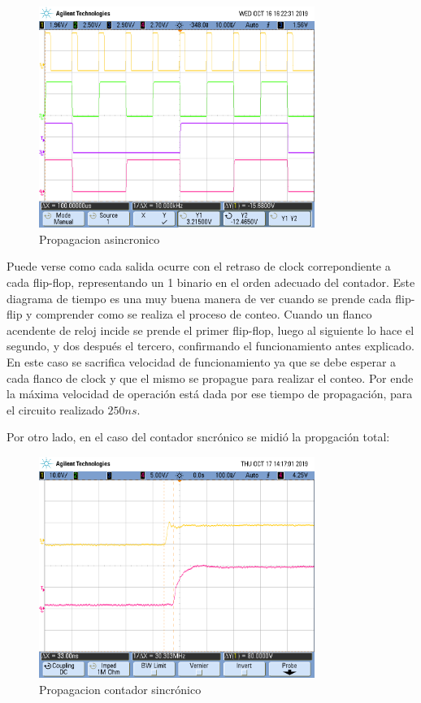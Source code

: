 \begin{figure}[H]
	\centering
	\includegraphics[width=0.8\textwidth]{Ejercicio7/Recursos/senales_asincronico.png}
	\caption{Propagacion asincronico}
\end{figure}

Puede verse como cada salida ocurre con el retraso de clock correpondiente a cada flip-flop, representando un 1 binario en el orden adecuado del contador. Este diagrama de tiempo es una muy buena manera de ver cuando se prende cada flip-flip y comprender como se realiza el proceso de conteo. Cuando un flanco acendente de reloj incide se prende el primer flip-flop, luego al siguiente lo hace el segundo, y dos después el tercero, confirmando el funcionamiento antes explicado. En este caso se sacrifica velocidad de funcionamiento ya que se debe esperar a cada flanco de clock y que el mismo se propague para realizar el conteo. Por ende la máxima velocidad de operación está dada por ese tiempo de propagación, para el circuito realizado $250ns$.

Por otro lado, en el caso del contador sncr\'onico se midi\'o la propgaci\'on total:


\begin{figure}[H]
	\centering
	\includegraphics[width=0.8\textwidth]{Ejercicio7/Recursos/propagacion_sincronico.png}
	\caption{Propagacion contador sincr\'onico}
\end{figure}

